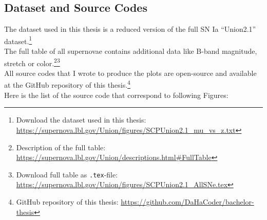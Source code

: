 \begin{appendix}

\chapter{Dataset and Source Codes}
\label{app:dataset-and-source-codes}
\thispagestyle{empty}

The dataset used in this thesis is a reduced version of the full SN Ia ``Union2.1'' dataset.\footnote{Download the dataset used in this thesis: \href{https://supernova.lbl.gov/Union/figures/SCPUnion2.1\_mu\_vs\_z.txt}{https://supernova.lbl.gov/Union/figures/SCPUnion2.1\_mu\_vs\_z.txt}} \\
The full table of all supernovae contains additional data like B-band magnitude, stretch or color.\footnote{Description of the full table: \href{https://supernova.lbl.gov/Union/descriptions.html\#FullTable}{https://supernova.lbl.gov/Union/descriptions.html\#FullTable}}\footnote{Download full table as \texttt{.tex}-file: \href{https://supernova.lbl.gov/Union/figures/SCPUnion2.1\_AllSNe.tex}{https://supernova.lbl.gov/Union/figures/SCPUnion2.1\_AllSNe.tex}} \\

\noindent All source codes that I wrote to produce the plots are open-source and available at the GitHub repository of this thesis.\footnote{GitHub repository of this thesis: \href{ https://github.com/DaHaCoder/bachelor-thesis}{https://github.com/DaHaCoder/bachelor-thesis}} \\
Here is the list of the source code that correspond to following Figures:


\end{appendix}
